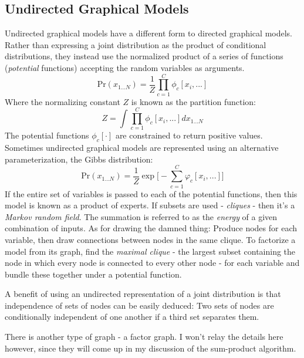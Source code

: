\documentclass[idxtotoc,hyperref,openany]{labbook} %
\begin{document}
\subsection*{Undirected Graphical Models}
Undirected graphical models have a different form to directed graphical models. Rather than expressing a joint distribution as the product of conditional distributions, they instead use the normalized product of a series of functions (\emph{potential} functions) accepting the random variables as arguments. 
\[
	\text{Pr}(x_{1...N}) = \frac{1}{Z}\prod_{c=1}^{C}\phi_c[x_{i}, ...]
\]
Where the normalizing constant $Z$ is known as the partition function: 
\[
	Z = \int \prod_{c=1}^C \phi_c[x_i, ...] dx_{1...N}
\]
The potential functions $\phi_c[\cdot]$ are constrained to return positive values. Sometimes undirected graphical models are represented using an alternative parameterization, the Gibbs distribution:
\[
	\text{Pr}(x_{1...N}) = \frac{1}{Z}\exp\big[-\sum_{c=1}^{C}\varphi_c[x_i,...]\big]
\]
If the entire set of variables is passed to each of the potential functions, then this model is known as a product of experts. If subsets are used - \emph{cliques} - then it's a \emph{Markov random field}. The summation is referred to as the \emph{energy} of a given combination of inputs. As for drawing the damned thing: Produce nodes for each variable, then draw connections between nodes in the same clique. To factorize a model from its graph, find the \emph{maximal clique} - the largest subset containing the node in which every node is connected to every other node - for each variable and bundle these together under a potential function.

A benefit of using an undirected representation of a joint distribution is that independence of sets of nodes can be easily deduced: Two sets of nodes are conditionally independent of one another if a third set separates them.

There is another type of graph - a factor graph. I won't relay the details here however, since they will come up in my discussion of the sum-product algorithm.
\end{document}
